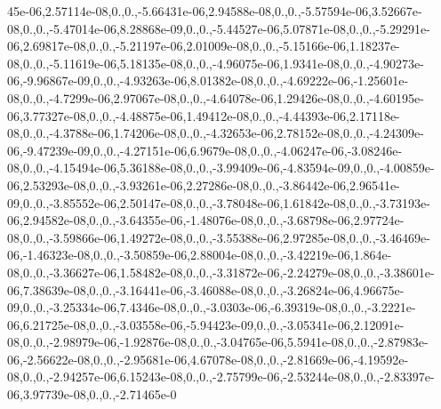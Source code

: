 {45e-\/06,2.\-57114e-\/08,0.,0.,-\/5.\-66431e-\/06,2.\-94588e-\/08,0.,0.,-\/5.\-57594e-\/06,3.\-52667e-\/08,0.,0.,-\/5.\-47014e-\/06,8.\-28868e-\/09,0.,0.,-\/5.\-44527e-\/06,5.\-07871e-\/08,0.,0.,-\/5.\-29291e-\/06,2.\-69817e-\/08,0.,0.,-\/5.\-21197e-\/06,2.\-01009e-\/08,0.,0.,-\/5.\-15166e-\/06,1.\-18237e-\/08,0.,0.,-\/5.\-11619e-\/06,5.\-18135e-\/08,0.,0.,-\/4.\-96075e-\/06,1.\-9341e-\/08,0.,0.,-\/4.\-90273e-\/06,-\/9.\-96867e-\/09,0.,0.,-\/4.\-93263e-\/06,8.\-01382e-\/08,0.,0.,-\/4.\-69222e-\/06,-\/1.\-25601e-\/08,0.,0.,-\/4.\-7299e-\/06,2.\-97067e-\/08,0.,0.,-\/4.\-64078e-\/06,1.\-29426e-\/08,0.,0.,-\/4.\-60195e-\/06,3.\-77327e-\/08,0.,0.,-\/4.\-48875e-\/06,1.\-49412e-\/08,0.,0.,-\/4.\-44393e-\/06,2.\-17118e-\/08,0.,0.,-\/4.\-3788e-\/06,1.\-74206e-\/08,0.,0.,-\/4.\-32653e-\/06,2.\-78152e-\/08,0.,0.,-\/4.\-24309e-\/06,-\/9.\-47239e-\/09,0.,0.,-\/4.\-27151e-\/06,6.\-9679e-\/08,0.,0.,-\/4.\-06247e-\/06,-\/3.\-08246e-\/08,0.,0.,-\/4.\-15494e-\/06,5.\-36188e-\/08,0.,0.,-\/3.\-99409e-\/06,-\/4.\-83594e-\/09,0.,0.,-\/4.\-00859e-\/06,2.\-53293e-\/08,0.,0.,-\/3.\-93261e-\/06,2.\-27286e-\/08,0.,0.,-\/3.\-86442e-\/06,2.\-96541e-\/09,0.,0.,-\/3.\-85552e-\/06,2.\-50147e-\/08,0.,0.,-\/3.\-78048e-\/06,1.\-61842e-\/08,0.,0.,-\/3.\-73193e-\/06,2.\-94582e-\/08,0.,0.,-\/3.\-64355e-\/06,-\/1.\-48076e-\/08,0.,0.,-\/3.\-68798e-\/06,2.\-97724e-\/08,0.,0.,-\/3.\-59866e-\/06,1.\-49272e-\/08,0.,0.,-\/3.\-55388e-\/06,2.\-97285e-\/08,0.,0.,-\/3.\-46469e-\/06,-\/1.\-46323e-\/08,0.,0.,-\/3.\-50859e-\/06,2.\-88004e-\/08,0.,0.,-\/3.\-42219e-\/06,1.\-864e-\/08,0.,0.,-\/3.\-36627e-\/06,1.\-58482e-\/08,0.,0.,-\/3.\-31872e-\/06,-\/2.\-24279e-\/08,0.,0.,-\/3.\-38601e-\/06,7.\-38639e-\/08,0.,0.,-\/3.\-16441e-\/06,-\/3.\-46088e-\/08,0.,0.,-\/3.\-26824e-\/06,4.\-96675e-\/09,0.,0.,-\/3.\-25334e-\/06,7.\-4346e-\/08,0.,0.,-\/3.\-0303e-\/06,-\/6.\-39319e-\/08,0.,0.,-\/3.\-2221e-\/06,6.\-21725e-\/08,0.,0.,-\/3.\-03558e-\/06,-\/5.\-94423e-\/09,0.,0.,-\/3.\-05341e-\/06,2.\-12091e-\/08,0.,0.,-\/2.\-98979e-\/06,-\/1.\-92876e-\/08,0.,0.,-\/3.\-04765e-\/06,5.\-5941e-\/08,0.,0.,-\/2.\-87983e-\/06,-\/2.\-56622e-\/08,0.,0.,-\/2.\-95681e-\/06,4.\-67078e-\/08,0.,0.,-\/2.\-81669e-\/06,-\/4.\-19592e-\/08,0.,0.,-\/2.\-94257e-\/06,6.\-15243e-\/08,0.,0.,-\/2.\-75799e-\/06,-\/2.\-53244e-\/08,0.,0.,-\/2.\-83397e-\/06,3.\-97739e-\/08,0.,0.,-\/2.\-71465e-\/0}

